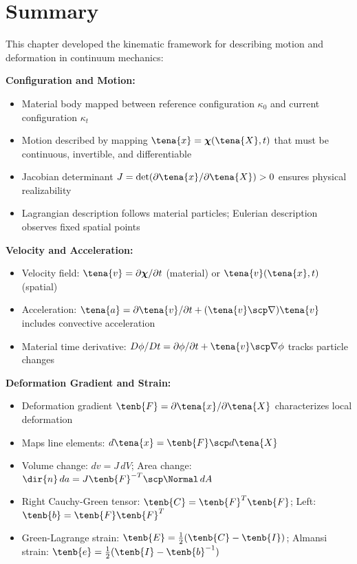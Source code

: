 \section{Summary}

\begin{subox}[Summary]
This chapter developed the kinematic framework for describing motion and deformation in continuum mechanics:

\textbf{Configuration and Motion:}
\begin{itemize}
\item Material body mapped between reference configuration $\kappa_0$ and current configuration $\kappa_t$
\item Motion described by mapping $\tena{x} = \boldsymbol{\chi}(\tena{X}, t)$ that must be continuous, invertible, and differentiable
\item Jacobian determinant $J = \det(\partial \tena{x}/\partial \tena{X}) > 0$ ensures physical realizability
\item Lagrangian description follows material particles; Eulerian description observes fixed spatial points
\end{itemize}

\textbf{Velocity and Acceleration:}
\begin{itemize}
\item Velocity field: $\tena{v} = \partial \boldsymbol{\chi}/\partial t$ (material) or $\tena{v}(\tena{x}, t)$ (spatial)
\item Acceleration: $\tena{a} = \partial \tena{v}/\partial t + (\tena{v} \scp \nabla)\tena{v}$ includes convective acceleration
\item Material time derivative: $D\phi/Dt = \partial\phi/\partial t + \tena{v} \scp \nabla \phi$ tracks particle changes
\end{itemize}

\textbf{Deformation Gradient and Strain:}
\begin{itemize}
\item Deformation gradient $\tenb{F} = \partial \tena{x}/\partial \tena{X}$ characterizes local deformation
\item Maps line elements: $d\tena{x} = \tenb{F} \scp d\tena{X}$
\item Volume change: $dv = J \, dV$; Area change: $\dir{n} \, da = J \tenb{F}^{-T} \scp \Normal \, dA$
\item Right Cauchy-Green tensor: $\tenb{C} = \tenb{F}^T \tenb{F}$; Left: $\tenb{b} = \tenb{F} \tenb{F}^T$
\item Green-Lagrange strain: $\tenb{E} = \frac{1}{2}(\tenb{C} - \tenb{I})$; Almansi strain: $\tenb{e} = \frac{1}{2}(\tenb{I} - \tenb{b}^{-1})$
\end{itemize}


\end{subox}

